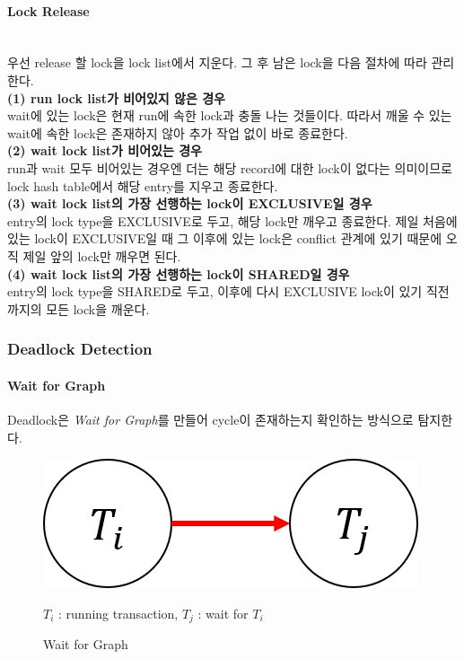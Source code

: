 \documentclass[main.tex]{subfiles}
\begin{document}
\paragraph{Lock Release}\mbox{}\\
우선 release 할 lock을 lock list에서 지운다. 그 후 남은 lock을 다음 절차에 따라 관리한다.\mbox{}\\

\noindent \textbf{(1) run lock list가 비어있지 않은 경우}\\
\indent wait에 있는 lock은 현재 run에 속한 lock과 충돌 나는 것들이다. 따라서 깨울 수 있는 wait에 속한 lock은 존재하지 않아 추가 작업 없이 바로 종료한다.
\mbox{}\\

\noindent \textbf{(2) wait lock list가 비어있는 경우}\\
\indent run과 wait 모두 비어있는 경우엔 더는 해당 record에 대한 lock이 없다는 의미이므로 lock hash table에서 해당 entry를 지우고 종료한다.
\mbox{}\\

\noindent \textbf{(3) wait lock list의 가장 선행하는 lock이 EXCLUSIVE일 경우}\\
\indent entry의 lock type을 EXCLUSIVE로 두고, 해당 lock만 깨우고 종료한다. 제일 처음에 있는 lock이 EXCLUSIVE일 때 그 이후에 있는 lock은 conflict 관계에 있기 때문에 오직 제일 앞의 lock만 깨우면 된다.
\mbox{}\\

\noindent \textbf{(4) wait lock list의 가장 선행하는 lock이 SHARED일 경우}\\
\indent entry의 lock type을 SHARED로 두고, 이후에 다시 EXCLUSIVE lock이 있기 직전까지의 모든 lock을 깨운다.
\mbox{}\\

\subsubsection{Deadlock Detection}

\paragraph{Wait for Graph}
Deadlock은 \emph{Wait for Graph}를 만들어 cycle이 존재하는지 확인하는 방식으로 탐지한다.

\begin{figure}[!hbp]
	\centering
	\includegraphics[width=.4\textwidth]{images/cc/wait_for_graph.png}
	
	$T_i$ : running transaction, $T_j$ : wait for $T_i$
	
	\caption{Wait for Graph}
\end{figure}
\end{document}
